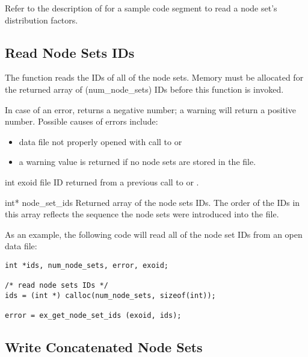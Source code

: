 Refer to the description of  for a
sample code segment to read a node set's distribution factors.


\subsection{Read Node Sets IDs }

The function  reads the IDs of all of
the node sets. Memory must be allocated for the returned array of
({num_node_sets}) IDs before this function is invoked.

In case of an error,  returns
a negative number; a warning will return a positive number.
Possible causes of errors include:

\begin{itemize}

 \item data file not properly opened with call to 
or 

 \item a warning value is returned if no node sets are stored
in the file.
\end{itemize}


\begin{parameters}
\item[{int exoid \R{}}]
\exo{} file ID returned from a previous call to 
or .

\item[{int}{* node_set_ids \W{}}]
Returned array of the node sets IDs. The order of the IDs in this array
reflects the sequence the node sets were introduced into the file.
\end{parameters}

As an example, the following code will read all of the node set IDs
from an open data file:

\begin{lstlisting}
int *ids, num_node_sets, error, exoid;

/* read node sets IDs */
ids = (int *) calloc(num_node_sets, sizeof(int));

error = ex_get_node_set_ids (exoid, ids);
\end{lstlisting}

\subsection{Write Concatenated Node Sets}

